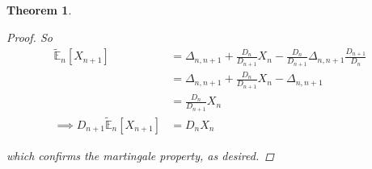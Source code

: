 \documentclass[12pt]{article}
\newtheorem{theorem}{Theorem}
\newcommand{\E}{\mathbb E}
\begin{document}
\begin{theorem}
\begin{proof}
So
\begin{align*}
	\tilde{\E}_n[X_{n + 1}] &= \Delta_{n, n + 1} + \frac{D_n}{D_{n + 1}}X_n - \frac{D_n}{D_{n + 1}}\Delta_{n,n + 1} \frac{D_{n + 1}}{D_n} \\
	&= \Delta_{n, n + 1} + \frac{D_n}{D_{n + 1}}X_n - \Delta_{n,n + 1}  \\
	&= \frac{D_n}{D_{n + 1}}X_n \\
	\implies D_{n + 1}\tilde{\E}_n[X_{n + 1}] &= D_nX_n
\end{align*}

which confirms the martingale property, as desired.
\end{proof}
\end{theorem}
\end{document}
